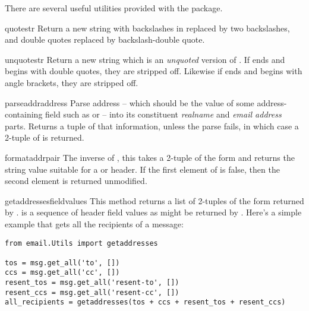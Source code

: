 
There are several useful utilities provided with the 
package.

\begin{funcdesc}{quote}{str}
Return a new string with backslashes in  replaced by two
backslashes, and double quotes replaced by backslash-double quote.
\end{funcdesc}

\begin{funcdesc}{unquote}{str}
Return a new string which is an \emph{unquoted} version of .
If  ends and begins with double quotes, they are stripped
off.  Likewise if  ends and begins with angle brackets, they
are stripped off.
\end{funcdesc}

\begin{funcdesc}{parseaddr}{address}
Parse address -- which should be the value of some address-containing
field such as  or  -- into its constituent
\emph{realname} and \emph{email address} parts.  Returns a tuple of that
information, unless the parse fails, in which case a 2-tuple of
 is returned.
\end{funcdesc}

\begin{funcdesc}{formataddr}{pair}
The inverse of , this takes a 2-tuple of the form
 and returns the string value suitable
for a  or  header.  If the first element of
 is false, then the second element is returned unmodified.
\end{funcdesc}

\begin{funcdesc}{getaddresses}{fieldvalues}
This method returns a list of 2-tuples of the form returned by
.   is a sequence of header field
values as might be returned by .  Here's a
simple example that gets all the recipients of a message:

\begin{verbatim}
from email.Utils import getaddresses

tos = msg.get_all('to', [])
ccs = msg.get_all('cc', [])
resent_tos = msg.get_all('resent-to', [])
resent_ccs = msg.get_all('resent-cc', [])
all_recipients = getaddresses(tos + ccs + resent_tos + resent_ccs)
\end{verbatim}
\end{funcdesc}

